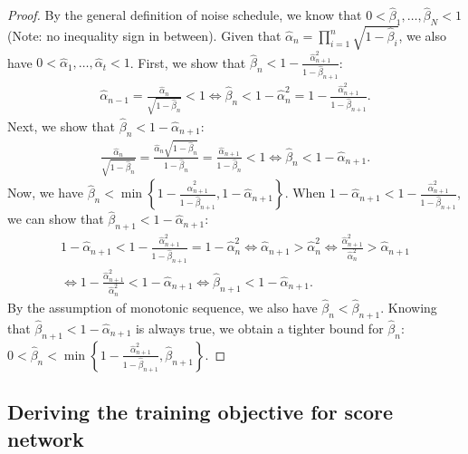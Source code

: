 \begin{proof}
By the general definition of noise schedule, we know that $0<\hat{\beta}_{1},\dotsc,\hat{\beta}_{N}<1$ (Note: no inequality sign in between).
Given that $\hat{\alpha}_n=\prod_{i=1}^{n}\sqrt{1-\hat{\beta}_{i}}$, we also have $0<\hat{\alpha}_1,\dotsc,\hat{\alpha}_t<1$. First, we show that $\hat{\beta}_{n} < 1 - \frac{\hat{\alpha}_{n+1}^2}{1-\hat{\beta}_{n+1}}$:
\begin{align}
\hat{\alpha}_{n-1}=\frac{\hat{\alpha}_{n}}{\sqrt{1-\hat{\beta}_{n}}}<1 \Longleftrightarrow
\hat{\beta}_{n} < 1-\hat{\alpha}_{n}^2=1 - \frac{\hat{\alpha}_{n+1}^2}{1-\hat{\beta}_{n+1}}.
\end{align}
Next, we show that $\hat{\beta}_{n}<1-\hat{\alpha}_{n+1}$:
\begin{align}
\frac{\hat{\alpha}_{n}}{\sqrt{1-\hat{\beta}_{n}}}=\frac{\hat{\alpha}_{n}\sqrt{1-\hat{\beta}_{n}}}{1-\hat{\beta}_{n}}=\frac{\hat{\alpha}_{n+1}}{1-\hat{\beta}_{n}}<1 \Longleftrightarrow
\hat{\beta}_{n} < 1-\hat{\alpha}_{n+1}.
\end{align}
Now, we have $\hat{\beta}_{n}<\min\left\{1-\frac{\hat{\alpha}_{n+1}^2}{1-\hat{\beta}_{n+1}}, 1-\hat{\alpha}_{n+1}\right\}$.
When $1 - \hat{\alpha}_{n+1} < 1-\frac{\hat{\alpha}_{n+1}^2}{1-\hat{\beta}_{n+1}}$, we can show that $\hat{\beta}_{n+1} < 1 - \hat{\alpha}_{n+1}$:
\begin{align}
    1-\hat{\alpha}_{n+1}< 1-\frac{\hat{\alpha}_{n+1}^2}{1-\hat{\beta}_{n+1}}=1-\hat{\alpha}_{n}^2\Longleftrightarrow
    \hat{\alpha}_{n+1}> \hat{\alpha}_{n}^2\Longleftrightarrow
    \frac{\hat{\alpha}_{n+1}^2}{\hat{\alpha}_{n}^2}> \hat{\alpha}_{n+1}\\\Longleftrightarrow
    1-\frac{\hat{\alpha}_{n+1}^2}{\hat{\alpha}_{n}^2}< 1-\hat{\alpha}_{n+1}\Longleftrightarrow
    \hat{\beta}_{n+1}< 1-\hat{\alpha}_{n+1}.
\end{align}
By the assumption of monotonic sequence, we also have $\hat{\beta}_{n}<\hat{\beta}_{n+1}$. Knowing that $\hat{\beta}_{n+1}< 1-\hat{\alpha}_{n+1}$ is always true, we obtain a tighter bound for $\hat{\beta}_{n}$: $0<\hat{\beta}_{n}<\min\left\{1-\frac{\hat{\alpha}_{n+1}^2}{1-\hat{\beta}_{n+1}}, \hat{\beta}_{n+1}\right\}$.
\end{proof}

\subsection{Deriving the training objective for score network}
\label{proof:score_network_loss}

